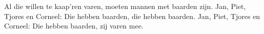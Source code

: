 \beginverse*
Al die willen te kaap'ren  varen, moeten mannen met baarden zijn.
Jan, Piet, Tjores en Corneel: Die hebben baarden, die hebben baarden.
Jan, Piet, Tjores en Corneel: Die hebben baarden, zij varen mee.
\endverse
\endsong